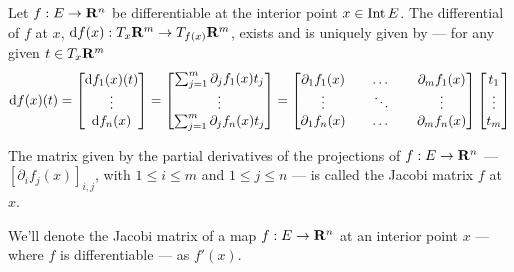 \begin{corollary}
    \label{cor: several-differential}
    Let \(f: E \to \mathbf{R}^n\) be differentiable at the interior point \(x \in \operatorname{Int}
    E\). The differential of \(f\) at \(x\), \(\mathrm{d} f(x): T_x\mathbf{R}^m \to
    T_{f(x)}\mathbf{R}^m\), exists and is uniquely given by --- for any given \(t \in
    T_x\mathbf{R}^m\)
    \begin{equation}\label{eq: several-differential}
        \mathrm{d} f(x)(t) =
        \begin{bmatrix}
            \mathrm{d} f_1(x)(t) \\ \vdots \\ \mathrm{d} f_n(x)
        \end{bmatrix}
        =
        \begin{bmatrix}
            \sum_{j=1}^m \partial_j f_1(x) t_j
            \\ \vdots \\
            \sum_{j=1}^m \partial_j f_n(x) t_j
        \end{bmatrix}
        =
        \begin{bmatrix}
            \partial_1 f_1(x) &  & \dots  &  & \partial_m f_1(x) \\
            \vdots            &  & \ddots &  & \vdots            \\
            \partial_1 f_n(x) &  & \dots  &  & \partial_m f_n(x)
        \end{bmatrix}
        \begin{bmatrix}
            t_1 \\ \vdots \\ t_m
        \end{bmatrix}
    \end{equation}
\end{corollary}

\begin{definition}\label{def: jacobi-matrix}
    The matrix given by the partial derivatives of the projections of \(f: E \to
    \mathbf{R}^n\) --- \([\partial_i f_j(x)]_{i, j}\), with \(1 \leq i \leq m\) and \(1
    \leq j \leq n\) --- is called the Jacobi matrix \(f\) at \(x\).
\end{definition}

\begin{notation}
    We'll denote the Jacobi matrix of a map \(f: E \to \mathbf{R}^n\) at an interior point
    \(x\) --- where \(f\) is differentiable --- as \(f'(x)\).
\end{notation}

